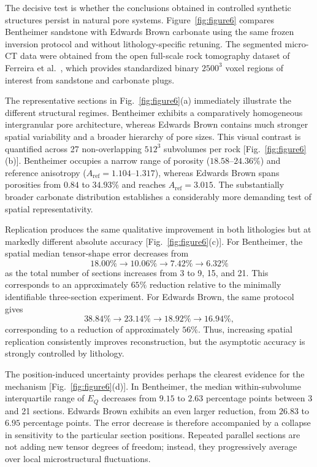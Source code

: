 \documentclass{article}
\begin{document}
The decisive test is whether the conclusions obtained in controlled synthetic structures persist in natural pore systems. Figure~\ref{fig:figure6} compares Bentheimer sandstone with Edwards Brown carbonate using the same frozen inversion protocol and without lithology-specific retuning. The segmented micro-CT data were obtained from the open full-scale rock tomography dataset of Ferreira et al.~\cite{Ferreira2023}, which provides standardized binary $2500^3$ voxel regions of interest from sandstone and carbonate plugs.

The representative sections in Fig.~\ref{fig:figure6}(a) immediately illustrate the different structural regimes. Bentheimer exhibits a comparatively homogeneous intergranular pore architecture, whereas Edwards Brown contains much stronger spatial variability and a broader hierarchy of pore sizes. This visual contrast is quantified across 27 non-overlapping $512^3$ subvolumes per rock [Fig.~\ref{fig:figure6}(b)]. Bentheimer occupies a narrow range of porosity ($18.58$--$24.36\%$) and reference anisotropy ($A_{\mathrm{ref}}=1.104$--$1.317$), whereas Edwards Brown spans porosities from $0.84$ to $34.93\%$ and reaches $A_{\mathrm{ref}}=3.015$. The substantially broader carbonate distribution establishes a considerably more demanding test of spatial representativity.

Replication produces the same qualitative improvement in both lithologies but at markedly different absolute accuracy [Fig.~\ref{fig:figure6}(c)]. For Bentheimer, the spatial median tensor-shape error decreases from
%
\[
18.00\%
\rightarrow
10.06\%
\rightarrow
7.42\%
\rightarrow
6.32\%
\]
%
as the total number of sections increases from 3 to 9, 15, and 21. This corresponds to an approximately $65\%$ reduction relative to the minimally identifiable three-section experiment. For Edwards Brown, the same protocol gives
%
\[
38.84\%
\rightarrow
23.14\%
\rightarrow
18.92\%
\rightarrow
16.94\%,
\]
%
corresponding to a reduction of approximately $56\%$. Thus, increasing spatial replication consistently improves reconstruction, but the asymptotic accuracy is strongly controlled by lithology.

The position-induced uncertainty provides perhaps the clearest evidence for the mechanism [Fig.~\ref{fig:figure6}(d)]. In Bentheimer, the median within-subvolume interquartile range of $E_Q$ decreases from $9.15$ to $2.63$ percentage points between 3 and 21 sections. Edwards Brown exhibits an even larger reduction, from $26.83$ to $6.95$ percentage points. The error decrease is therefore accompanied by a collapse in sensitivity to the particular section positions. Repeated parallel sections are not adding new tensor degrees of freedom; instead, they progressively average over local microstructural fluctuations.
\end{document}
